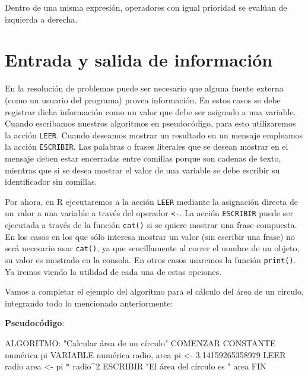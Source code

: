 \documentclass[
]{book}
\newenvironment{Shaded}{\begin{snugshade}}{\end{snugshade}}
\newcommand{\NormalTok}[1]{#1}
\begin{document}
Dentro de una misma expresión, operadores con igual prioridad se evalúan de izquierda a derecha.

\hypertarget{entrada-y-salida-de-informaciuxf3n}{%
\section{Entrada y salida de información}\label{entrada-y-salida-de-informaciuxf3n}}

En la resolución de problemas puede ser necesario que alguna fuente externa (como un usuario del programa) provea información. En estos casos se debe registrar dicha información como un valor que debe ser asignado a una variable. Cuando escribamos nuestros algoritmos en pseudocódigo, para esto utilizaremos la acción \texttt{LEER}. Cuando deseamos mostrar un resultado en un mensaje empleamos la acción \texttt{ESCRIBIR}. Las palabras o frases literales que se desean mostrar en el mensaje deben estar encerradas entre comillas porque son cadenas de texto, mientras que si se desea mostrar el valor de una variable se debe escribir su identificador sin comillas.

Por ahora, en R ejecutaremos a la acción \texttt{LEER} mediante la asignación directa de un valor a una variable a través del operador \texttt{\textless{}-}. La acción \texttt{ESCRIBIR} puede ser ejecutada a través de la función \texttt{cat()} si se quiere mostrar una frase compuesta. En los casos en los que sólo interesa mostrar un valor (sin escribir una frase) no será necesario usar \texttt{cat()}, ya que sencillamente al correr el nombre de un objeto, su valor es mostrado en la consola. En otros casos usaremos la función \texttt{print()}. Ya iremos viendo la utilidad de cada una de estas opciones.

Vamos a completar el ejemplo del algoritmo para el cálculo del área de un círculo, integrando todo lo mencionado anteriormente:

\textbf{Pseudocódigo}:

\begin{Shaded}
\begin{Highlighting}[]
\NormalTok{ALGORITMO: "Calcular área de un círculo"}
\NormalTok{COMENZAR}
\NormalTok{    CONSTANTE numérica pi}
\NormalTok{    VARIABLE numérica radio, area}
\NormalTok{    pi \textless{}{-} 3.14159265358979}
\NormalTok{    LEER radio}
\NormalTok{    area \textless{}{-} pi * radio\^{}2}
\NormalTok{    ESCRIBIR "El área del círculo es " area}
\NormalTok{FIN}
\end{Highlighting}
\end{Shaded}
\end{document}
